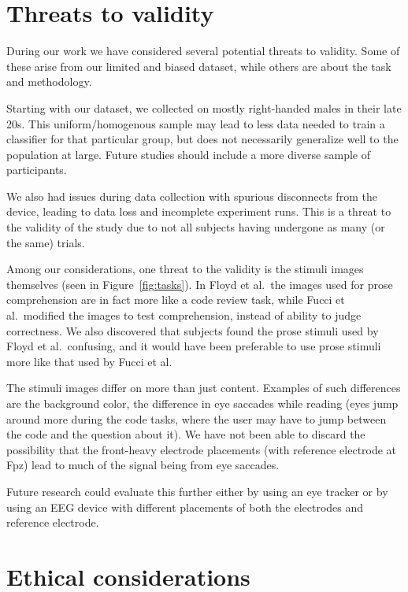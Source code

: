 \section{Threats to validity}\label{section:threats}

    During our work we have considered several potential threats to validity. Some of these arise from our limited and biased dataset, while others are about the task and methodology.

    Starting with our dataset, we collected on mostly right-handed males in their late 20s. This uniform/homogenous sample may lead to less data needed to train a classifier for that particular group, but does not necessarily generalize well to the population at large. Future studies should include a more diverse sample of participants.

    We also had issues during data collection with spurious disconnects from the device, leading to data loss and incomplete experiment runs. This is a threat to the validity of the study due to not all subjects having undergone as many (or the same) trials.

    Among our considerations, one threat to the validity is the stimuli images themselves (seen in Figure~\ref{fig:tasks}). In Floyd et al.~the images used for prose comprehension are in fact more like a code review task, while Fucci et al.~modified the images to test comprehension, instead of ability to judge correctness. We also discovered that subjects found the prose stimuli used by Floyd et al.~confusing, and it would have been preferable to use prose stimuli more like that used by Fucci et al.

    The stimuli images differ on more than just content. Examples of such differences are the background color, the difference in eye saccades while reading (eyes jump around more during the code tasks, where the user may have to jump between the code and the question about it). We have not been able to discard the possibility that the front-heavy electrode placements (with reference electrode at Fpz) lead to much of the signal being from eye saccades. 

    Future research could evaluate this further either by using an eye tracker or by using an EEG device with different placements of both the electrodes and reference electrode.


\section{Ethical considerations}

